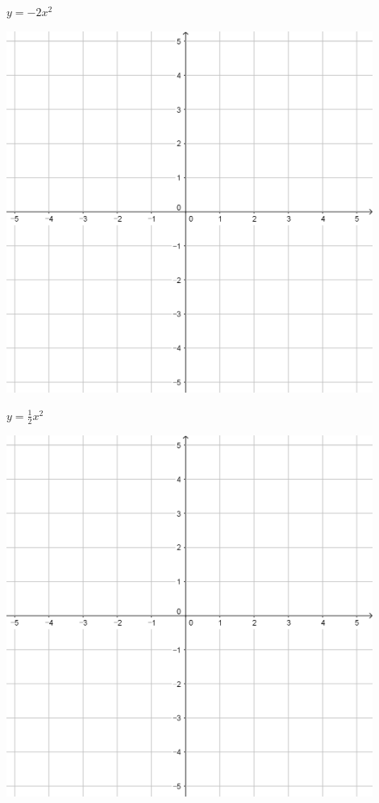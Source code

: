 \documentclass{oblivoir}
\begin{document}
\clearpage
\begin{minipage}{0.45\textwidth}\centering
\(y=-2x^2\)
\par\bigskip\includegraphics[width=0.9\textwidth]{55}
\end{minipage}
\begin{minipage}{0.45\textwidth}\centering
\(y=\frac12x^2\)
\par\bigskip\includegraphics[width=0.9\textwidth]{55}
\end{minipage}\bigskip\bigskip\par
\end{document}

